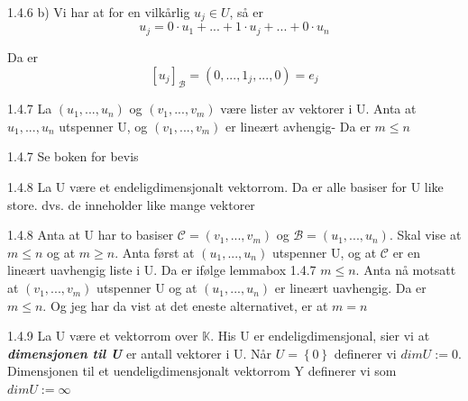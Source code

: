 \documentclass[a4paper,norsk]{article}
\renewcommand{\geq}{\geqslant}
\renewcommand{\leq}{\leqslant}
\begin{document}
\begin{proofbox}{1.4.6 b)}{}
Vi har at for en vilkårlig $ u_j \in U $, så er 
\[
    u_j = 0 \cdot u_1 + ... + 1 \cdot u_j + ... + 0 \cdot u_n
\] 

Da er 
\[
    \left[ u_j \right] _{\mathcal{B}} = \left( 0, ..., 1_j, ..., 0 \right) = e_j
\]
 
\end{proofbox}

\begin{lemmabox}{1.4.7}{}
La $ \left( u_1, ..., u_n \right)  $ og $ \left( v_1, ..., v_m \right)  $ være lister av vektorer i U. Anta at $ u_1, ..., u_n $ utspenner U, og $ \left( v_1, ..., v_m \right)  $ er lineært avhengig- Da er $ m \leq n $ 
\end{lemmabox}
\begin{proofbox}{1.4.7}{}
Se boken for bevis
\end{proofbox}

\begin{theorembox}{1.4.8}{}
La U være et endeligdimensjonalt vektorrom. Da er alle basiser for U like store. dvs. de inneholder like mange vektorer
\end{theorembox}

\begin{proofbox}{1.4.8}{}
Anta at U har to basiser $ \mathcal{C} = \left( v_1, ..., v_m \right)  $ og $ \mathcal{B} = \left( u_1, ..., u_n \right)  $. Skal vise at $ m \leq n $ og at $ m\geq n $. Anta først at $ \left( u_1, ..., u_n \right) $ utspenner U, og at $ \mathcal{C} $ er en lineært uavhengig liste i U. Da er ifølge lemmabox 1.4.7 $ m \leq n $. Anta nå motsatt at $ \left( v_1, ..., v_m  \right)  $ utspenner U og at $ \left( u_1, ..., u_n \right)  $ er lineært uavhengig. Da er $ m \leq n $. Og jeg har da vist at det eneste alternativet, er at $ m=n $  
\end{proofbox}

\begin{definitionbox}{1.4.9}{}
La U være et vektorrom over $ \mathbb{K}$. His U er endeligdimensjonal, sier vi at \textbf{\textit{dimensjonen til U }} er antall vektorer i U. Når $ U = \left\{ 0 \right\}  $ definerer vi $ dim U := 0 $. Dimensjonen til et uendeligdimensjonalt vektorrom Y definerer vi som $ dim U := \infty $ 
\end{definitionbox}
\end{document}
